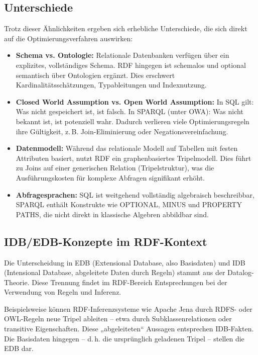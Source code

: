 \documentclass[12pt]{article}
\begin{document}
\subsection{Unterschiede}

Trotz dieser Ähnlichkeiten ergeben sich erhebliche Unterschiede, die sich direkt auf die Optimierungsverfahren auswirken:

\begin{itemize}
    \item \textbf{Schema vs. Ontologie:} Relationale Datenbanken verfügen über ein explizites, vollständiges Schema. RDF hingegen ist schemalos und optional semantisch über Ontologien ergänzt. Dies erschwert Kardinalitätsschätzungen, Typableitungen und Indexnutzung.
    
    \item \textbf{Closed World Assumption vs. Open World Assumption:} In SQL gilt: Was nicht gespeichert ist, ist falsch. In SPARQL (unter OWA): Was nicht bekannt ist, ist potenziell wahr. Dadurch verlieren viele Optimierungsregeln ihre Gültigkeit, z.\,B. Join-Eliminierung oder Negationsvereinfachung.
    
    \item \textbf{Datenmodell:} Während das relationale Modell auf Tabellen mit festen Attributen basiert, nutzt RDF ein graphenbasiertes Tripelmodell. Dies führt zu Joins auf einer generischen Relation (Tripelstruktur), was die Ausführungskosten für komplexe Abfragen signifikant erhöht.
    
    \item \textbf{Abfragesprachen:} SQL ist weitgehend vollständig algebraisch beschreibbar, SPARQL enthält Konstrukte wie OPTIONAL, MINUS und PROPERTY PATHS, die nicht direkt in klassische Algebren abbildbar sind.
\end{itemize}

\subsection{IDB/EDB-Konzepte im RDF-Kontext}

Die Unterscheidung in EDB (Extensional Database, also Basisdaten) und IDB (Intensional Database, abgeleitete Daten durch Regeln) stammt aus der Datalog-Theorie. Diese Trennung findet im RDF-Bereich Entsprechungen bei der Verwendung von Regeln und Inferenz.

Beispielsweise können RDF-Inferenzsysteme wie Apache Jena durch RDFS- oder OWL-Regeln neue Tripel ableiten – etwa durch Subklassenrelationen oder transitive Eigenschaften. Diese „abgeleiteten“ Aussagen entsprechen IDB-Fakten. Die Basisdaten hingegen – d.\,h. die ursprünglich geladenen Tripel – stellen die EDB dar.
\end{document}
